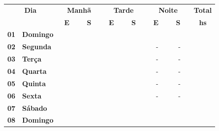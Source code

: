 \documentclass[a4paper, portugues,11pt]{article}
\begin{document}
\begin{table}[htb]
  \begin{center}
  \begin{tabular}{|l|l||c|c|c|c|c|c|c|}
  \hline
  \multicolumn{2}{|c|}{\bf Dia} & \multicolumn{2}{|c|}{\bf Manhã} & \multicolumn{2}{|c|}{\bf Tarde} & \multicolumn{2}{|c|}{\bf Noite} & {\bf Total} \\ \cline{3-9}
  \multicolumn{2}{|c|}{\bf }  & {\bf \ E \ } & {\bf \ S \ } & {\bf  \ E \ } & {\bf \ S \ } & {\bf \ E \ } & {\bf \ S \ } & {\bf hs} \\
      \hline \cline{1-09}
  
  {\bf 01} & {\bf Domingo} & \colorbox{Gray}{\hspace{6mm}} & \colorbox{Gray}{\hspace{6mm}} & \colorbox{Gray}{\hspace{6mm}} & \colorbox{Blue}{\hspace{6mm}} & \colorbox{Gray}{\hspace{6mm}} & \colorbox{Gray}{\hspace{6mm}} & \colorbox{Gray}{\hspace{9mm}}  \\ \hline 
  {\bf 02} & {\bf Segunda} &  &  &  &  & - & - &   \\ \hline
  {\bf 03} & {\bf Terça} &  &  &  &  &  - & - &  \\ \hline 
  {\bf 04} & {\bf Quarta} &  &  &  &  &  - & - &  \\ \hline  
  {\bf 05} & {\bf Quinta} &  &  &  &  &  - & - &  \\ \hline
  {\bf 06} & {\bf Sexta} &  &  &  &  &  - & - &  \\ \hline
  {\bf 07} & {\bf Sábado} & \colorbox{Gray}{\hspace{6mm}} & \colorbox{Gray}{\hspace{6mm}} & \colorbox{Gray}{\hspace{6mm}} & \colorbox{Gray}{\hspace{6mm}} & \colorbox{Gray}{\hspace{6mm}} & \colorbox{Gray}{\hspace{6mm}} & \colorbox{Gray}{\hspace{9mm}}  \\ \hline 
  {\bf 08} & {\bf Domingo} & \colorbox{Gray}{\hspace{6mm}} & \colorbox{Gray}{\hspace{6mm}} & \colorbox{Gray}{\hspace{6mm}} & \colorbox{Gray}{\hspace{6mm}} & \colorbox{Gray}{\hspace{6mm}} & \colorbox{Gray}{\hspace{6mm}} & \colorbox{Gray}{\hspace{9mm}}  \\ \hline 

\end{tabular}
\end{center}
\end{table}
\end{document}

